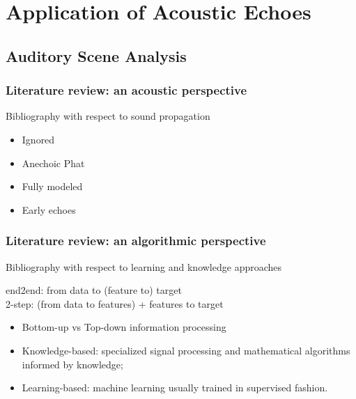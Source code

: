 \chapter{Application of Acoustic Echoes}\label{chap:application}

 \blindtext

\section{Auditory Scene Analysis}


\subsection{Literature review: an acoustic perspective}
Bibliography with respect to sound propagation
\begin{itemize}
    \item Ignored
    \item Anechoic Phat
    \item Fully modeled
    \item Early echoes
\end{itemize}

\subsection{Literature review: an algorithmic perspective}\cite{subsec:application:algos}
Bibliography with respect to learning and knowledge approaches




end2end: from data to (feature to) target
\\2-step: (from data to features) + features to target

\begin{itemize}
    \item Bottom-up vs Top-down information processing
    \item Knowledge-based: specialized signal processing and mathematical algorithms informed by knowledge;
    \item Learning-based: machine learning usually trained in supervised fashion.
\end{itemize}



